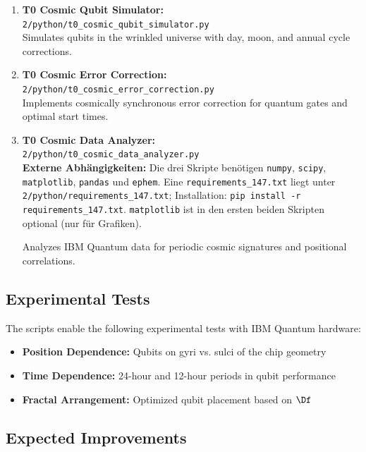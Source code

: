 \begin{enumerate}
	\item \textbf{T0 Cosmic Qubit Simulator:} \\
	\texttt{2/python/t0\_cosmic\_qubit\_simulator.py} \\
	Simulates qubits in the wrinkled universe with day, moon, and annual cycle corrections.
	
	\item \textbf{T0 Cosmic Error Correction:} \\
	\texttt{2/python/t0\_cosmic\_error\_correction.py} \\
	Implements cosmically synchronous error correction for quantum gates and optimal start times.
	
	\item \textbf{T0 Cosmic Data Analyzer:} \\
	\texttt{2/python/t0\_cosmic\_data\_analyzer.py} \\

\smallskip
\textbf{Externe Abhängigkeiten:} Die drei Skripte ben\"otigen
\texttt{numpy}, \texttt{scipy}, \texttt{matplotlib},
\texttt{pandas} und \texttt{ephem}. Eine
\texttt{requirements\_147.txt} liegt unter
\texttt{2/python/requirements\_147.txt};
Installation: \texttt{pip install -r requirements\_147.txt}.
\texttt{matplotlib} ist in den ersten beiden Skripten optional
(nur f\"ur Grafiken).

	Analyzes IBM Quantum data for periodic cosmic signatures and positional correlations.
\end{enumerate}

\subsection{Experimental Tests}

The scripts enable the following experimental tests with IBM Quantum hardware:

\begin{itemize}
	\item \textbf{Position Dependence:} Qubits on gyri vs. sulci of the chip geometry
	\item \textbf{Time Dependence:} 24-hour and 12-hour periods in qubit performance
	\item \textbf{Fractal Arrangement:} Optimized qubit placement based on $\Df$
\end{itemize}

\subsection{Expected Improvements}

